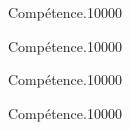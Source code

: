 \begin{pageAuto} %

\begin{ExoAutoN}{Compétence.}{1}{0}{0}{0}{0}

\end{ExoAutoN}

\begin{ExoAutoN}{Compétence.}{1}{0}{0}{0}{0}

\end{ExoAutoN}


\begin{ExoAutoN}{Compétence.}{1}{0}{0}{0}{0}

\end{ExoAutoN}


\begin{ExoAutoN}{Compétence.}{1}{0}{0}{0}{0}

\end{ExoAutoN}

\end{pageAuto} %


\begin{pageBrouillon}

\end{pageBrouillon}



